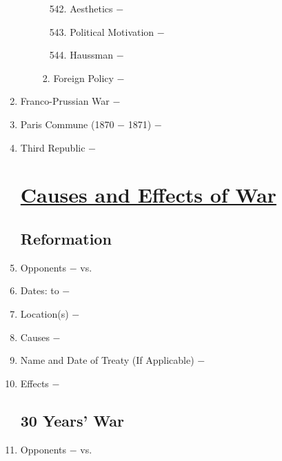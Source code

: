 \documentclass[12pt]{article}
\begin{document}
\begin{enumerate}
\begin{enumerate}[label=\arabic{*}.]
\begin{enumerate}[label=\arabic{*}.]
\begin{enumerate}[label=\arabic{*}.]
\setcounter{enumiv}{541}

\item Aesthetics $-$ 

\item Political Motivation $-$ 

\item Haussman $-$ 

\end{enumerate}
\setcounter{enumiii}{544}

\item Foreign Policy $-$

\end{enumerate}
\end{enumerate}
\setcounter{enumi}{545}


\item Franco-Prussian War $-$

\item Paris Commune (1870 $-$ 1871) $-$ 

\item Third Republic $-$


\section{\underline{Causes and Effects of War}}

\subsection{Reformation} 

\item Opponents $-$ vs.

\item Dates: to $-$

\item Location(s) $-$ 

\item Causes $-$

\item Name and Date of Treaty (If Applicable) $-$ 

\item Effects $-$ 

\subsection{30 Years' War}

\item Opponents $-$ vs.


\end{enumerate}
\end{document}
